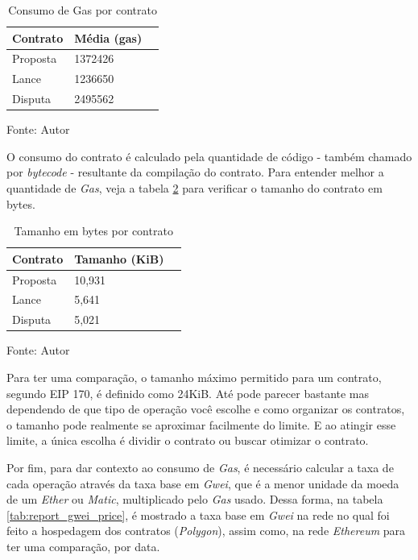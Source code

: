 \begin{table}[!h]
\centering
\caption{Consumo de Gas por contrato}
\label{tab:report_gas_contract}
\begin{tabular}{@{}lll@{}}
\toprule
Contrato    & Média (gas) \\ \midrule
Proposta  & 1372426 \\
Lance     & 1236650 \\
Disputa   & 2495562 \\ \bottomrule
\end{tabular}
\begin{tablenotes}
  \small
  \item Fonte: Autor
\end{tablenotes}
\end{table}

O consumo do contrato é calculado pela quantidade de código - também chamado por \textit{bytecode} - resultante da compilação do contrato. Para entender melhor a quantidade de \textit{Gas}, veja a tabela \ref{tab:report_contract_size} para verificar o tamanho do contrato em bytes.

\begin{table}[!h]
\centering
\caption{Tamanho em bytes por contrato}
\label{tab:report_contract_size}
\begin{tabular}{@{}lll@{}}
\toprule
Contrato  & Tamanho (KiB) \\ \midrule
Proposta  & 10,931 \\
Lance     & 5,641 \\
Disputa   & 5,021 \\ \bottomrule
\end{tabular}
\begin{tablenotes}
  \small
  \item Fonte: Autor
\end{tablenotes}
\end{table}

Para ter uma comparação, o tamanho máximo permitido para um contrato, segundo EIP 170, é definido como 24KiB. Até pode parecer bastante mas dependendo de que tipo de operação você escolhe e como organizar os contratos, o tamanho pode realmente se aproximar facilmente do limite. E ao atingir esse limite, a única escolha é dividir o contrato ou buscar otimizar o contrato.

Por fim, para dar contexto ao consumo de \textit{Gas}, é necessário calcular a taxa de cada operação através da taxa base em \textit{Gwei}, que é a menor unidade da moeda de um \textit{Ether} ou \textit{Matic}, multiplicado pelo \textit{Gas} usado. Dessa forma, na tabela \ref{tab:report_gwei_price}, é mostrado a taxa base em \textit{Gwei} na rede no qual foi feito a hospedagem dos contratos (\textit{Polygon}), assim como, na rede \textit{Ethereum} para ter uma comparação, por data.

